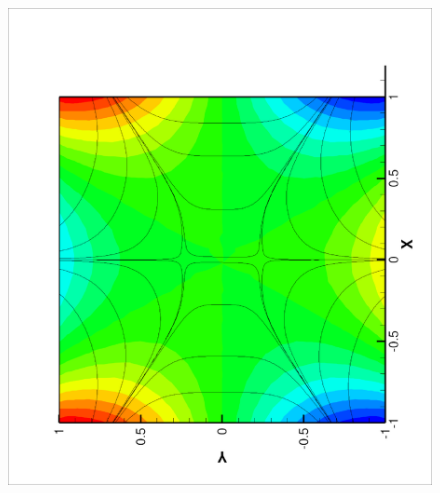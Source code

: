 \documentclass[a4paper, 11pt]{article}
\begin{document}
          \begin{figure}[!htbp]
            \begin{center}
              \begin{minipage}{0.495\textwidth}
                \centering
                \includegraphics[width = 1.0\textwidth, angle =
                -90]{picture/colliding_flow_data/streamline_20_005.eps}
              \end{minipage}
              \begin{minipage}{0.495\textwidth}
                \centering

\end{minipage}
\end{center}
\end{figure}
\end{document}
